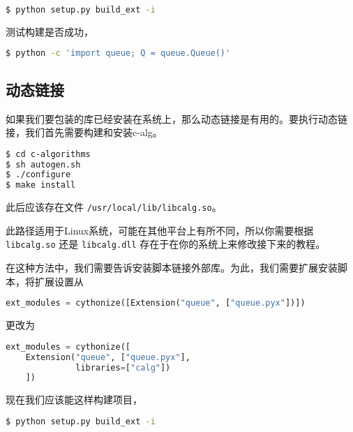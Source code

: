 \begin{translation}
\begin{framed}
\begin{lstlisting}[language=sh]
$ python setup.py build_ext -i
\end{lstlisting}
\end{framed}
测试构建是否成功，

\begin{framed}
\begin{lstlisting}[language=sh]
$ python -c 'import queue; Q = queue.Queue()'
\end{lstlisting}
\end{framed}

\subsection{动态链接}

如果我们要包装的库已经安装在系统上，那么动态链接是有用的。要执行动态链接，我们首先需要构建和安装c-alg。

\begin{framed}
\begin{lstlisting}[language=sh]
$ cd c-algorithms
$ sh autogen.sh
$ ./configure
$ make install
\end{lstlisting}
\end{framed}

此后应该存在文件 \lstinline{/usr/local/lib/libcalg.so}。

此路径适用于Linux系统，可能在其他平台上有所不同，所以你需要根据 \lstinline{libcalg.so} 还是 \lstinline{libcalg.dll} 存在于在你的系统上来修改接下来的教程。

在这种方法中，我们需要告诉安装脚本链接外部库。为此，我们需要扩展安装脚本，将扩展设置从

\begin{framed}
\begin{lstlisting}[language=python]
ext_modules = cythonize([Extension("queue", ["queue.pyx"])])
\end{lstlisting} 
\end{framed}
更改为
\begin{framed}
\begin{lstlisting}[language=python]
ext_modules = cythonize([
    Extension("queue", ["queue.pyx"],
              libraries=["calg"])
    ])
\end{lstlisting}
\end{framed}

现在我们应该能这样构建项目，
\begin{framed}
\begin{lstlisting}[language=sh]
$ python setup.py build_ext -i
\end{lstlisting}
\end{framed}


\end{translation}
